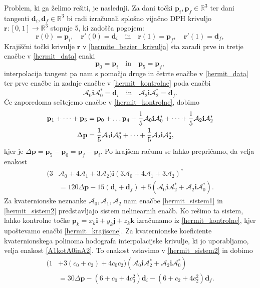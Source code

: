 \documentclass[12pt,a4paper,twoside]{article}
\theoremstyle{definition} %
\theoremstyle{plain} %
\theoremstyle{primerstyle}
\numberwithin{equation}{section}  %
\newcommand{\R}{\mathbb R}
\newcommand{\dV}{\mathbf{d}}
\newcommand{\pV}{\mathbf{p}}
\newcommand{\rV}{\mathbf{r}}
\newcommand{\iV}{\mathbf{i}}
\newcommand{\jV}{\mathbf{j}}
\newcommand{\kV}{\mathbf{k}}
\newcommand{\AQ}{\mathcal{A}}
\begin{document}
Problem, ki ga želimo rešiti, je naslednji. Za dani točki $\pV_i,\pV_f\in \R^3$ ter dani tangenti $\dV_i,\dV_f\in\R^3$ bi radi izračunali splošno vijačno DPH krivuljo $\rV:[0,1]\rightarrow\R^3$ stopnje 5, ki zadošča pogojem:
\begin{equation}
	\label{hermit_data}
	\rV(0)=\pV_i,\quad\rV'(0)=\dV_i\quad\text{in}\quad\rV(1)=\pV_f,\quad\rV'(1)=\dV_f,
\end{equation}
Krajiščni točki krivulje $\rV$ v \eqref{hermite_bezier_krivulja} sta zaradi prve in tretje enačbe v \eqref{hermit_data} enaki
\begin{equation}
	\label{hermit_krajiscne}
	\pV_0=\pV_i\quad\text{in}\quad\pV_5=\pV_f,
\end{equation}
interpolacija tangent pa nam s pomočjo druge in četrte enačbe v \eqref{hermit_data} ter prve enačbe in zadnje enačbe v \eqref{hermit_kontrolne} poda enačbi
\begin{equation}
	\label{hermit_sistem1}
	\AQ_0\iV\AQ_0^*=\dV_i\quad\text{in}\quad\AQ_2\iV\AQ_2^*=\dV_f.
\end{equation}
Če zaporedoma seštejemo enačbe v \eqref{hermit_kontrolne}, dobimo
\begin{align}
	\pV_1+\dots+\pV_5&=\pV_0+\dots\pV_4+\frac{1}{5}\AQ_0\iV\AQ_0^*+\dots+\frac{1}{5}\AQ_2\iV\AQ_2^*\notag\\
	\Delta\pV&=\frac{1}{5}\AQ_0\iV\AQ_0^*+\dots+\frac{1}{5}\AQ_2\iV\AQ_2^*\label{hermit_vsota},
\end{align}
kjer je $\Delta\pV=\pV_5-\pV_0=\pV_f-\pV_i.$
Po krajšem računu se lahko prepričamo, da velja enakost
\begin{align}
	\label{hermit_sistem2}
	(3&\AQ_0+4\AQ_1+3\AQ_2)\iV(3\AQ_0+4\AQ_1+3\AQ_2)^*\nonumber\\
	&=120\Delta\pV-15(\dV_i+\dV_f)+5(\AQ_0\iV\AQ_2^*+\AQ_2\iV\AQ_0^*).
\end{align}
Za kvaternionske neznanke $\AQ_0,\AQ_1,\AQ_2$ nam enačbe \eqref{hermit_sistem1} in \eqref{hermit_sistem2} predstavljajo sistem nelinearnih enačb. Ko rešimo ta sistem, lahko kontrolne točke $\pV_k=x_k\iV+y_k\jV+z_k\kV$ izračunamo iz \eqref{hermit_kontrolne}, kjer upoštevamo enačbi \eqref{hermit_krajiscne}. Za kvaternionske koeficiente kvaternionskega polinoma hodografa interpolacijske krivulje, ki jo uporabljamo, velja enakost \eqref{A1kotA0inA2}. To enakost vstavimo v \eqref{hermit_sistem2} in dobimo
\begin{align}
	\label{hermit_sistem3}
	(1&+3(c_0+c_2)+4c_0c_2)(\AQ_0\iV\AQ_2^*+\AQ_2\iV\AQ_0^*)\nonumber\\
	&=30\Delta\pV-(6+c_0+4c_0^2)\dV_i-(6+c_2+4c_2^2)\dV_f.
\end{align}
\end{document}
